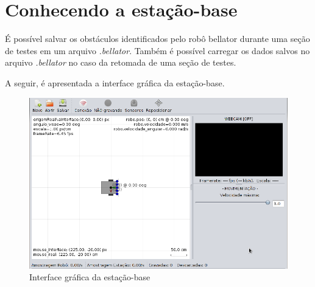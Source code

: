


\chapter{Conhecendo a estação-base}
É possível salvar os obstáculos identificados pelo robô bellator durante uma seção de testes em um arquivo \textit{.bellator}. Também é possível carregar os dados salvos no arquivo \textit{.bellator} no caso da retomada de uma seção de testes.

A seguir, é apresentada a interface gráfica da estação-base.

\begin{figure}[H]
\centering
\includegraphics[width=\textwidth]{./images/interface_grafica.png}
\caption{Interface gráfica da estação-base}
\label{fig:ui}
\end{figure}

